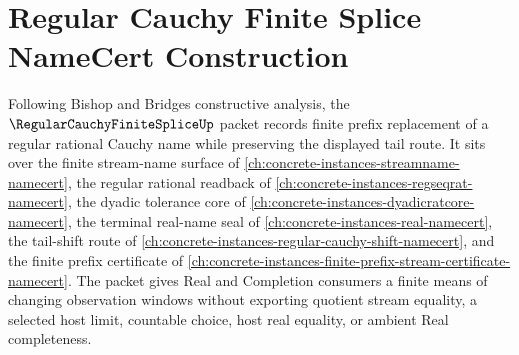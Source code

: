 \chapter{Regular Cauchy Finite Splice NameCert Construction}
\label{ch:concrete-instances-regular-cauchy-finite-splice-namecert}

Following Bishop and Bridges constructive analysis, the $\RegularCauchyFiniteSpliceUp$ packet records finite prefix replacement of a regular rational Cauchy name while preserving the displayed tail route. It sits over the finite stream-name surface of \autoref{ch:concrete-instances-streamname-namecert}, the regular rational readback of \autoref{ch:concrete-instances-regseqrat-namecert}, the dyadic tolerance core of \autoref{ch:concrete-instances-dyadicratcore-namecert}, the terminal real-name seal of \autoref{ch:concrete-instances-real-namecert}, the tail-shift route of \autoref{ch:concrete-instances-regular-cauchy-shift-namecert}, and the finite prefix certificate of \autoref{ch:concrete-instances-finite-prefix-stream-certificate-namecert}. The packet gives Real and Completion consumers a finite means of changing observation windows without exporting quotient stream equality, a selected host limit, countable choice, host real equality, or ambient Real completeness.

